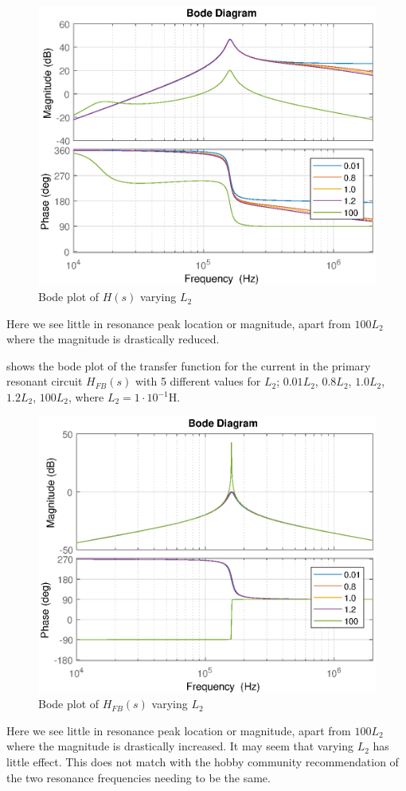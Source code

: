 \begin{figure}[H]
    \centering
    \includegraphics[width=\textwidth]{img/CoilRigBode_L2.eps}
    \caption{Bode plot of $H(s)$ varying $L_2$}
    \label{fig:bode_l2}
\end{figure}

Here we see little in resonance peak location or magnitude, apart from $100 L_2$ where the magnitude is drastically reduced.

 shows the bode plot of the transfer function for the current in the primary resonant circuit $H_{FB}(s)$ with 5 different values for $L_2$; $0.01 L_2$, $0.8 L_2$, $1.0 L_2$, $1.2 L_2$, $100 L_2$, where $L_2 = 1 \cdot 10^{-1}$H.
\begin{figure}[H]
    \centering
    \includegraphics[width=\textwidth]{img/FeedBackBode_L2.eps}
    \caption{Bode plot of $H_{FB}(s)$ varying $L_2$}
    \label{fig:fbbode_l2}
\end{figure}
Here we see little in resonance peak location or magnitude, apart from $100 L_2$ where the magnitude is drastically increased. It may seem that varying $L_2$ has little effect. This does not match with the hobby community recommendation of the two resonance frequencies needing to be the same.
